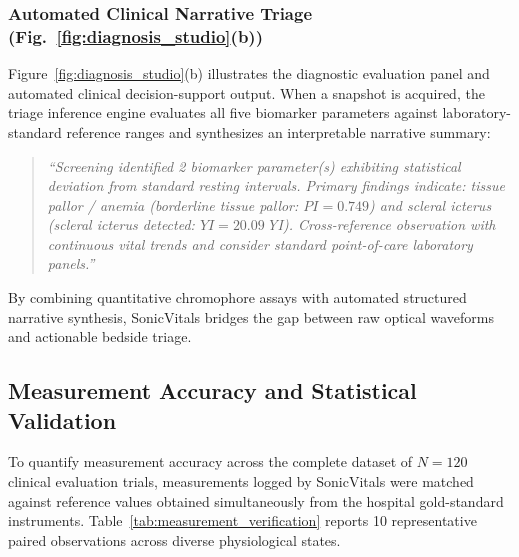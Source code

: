 \documentclass[journal]{IEEEtran}
\begin{document}
\subsubsection{Automated Clinical Narrative Triage (Fig.~\ref{fig:diagnosis_studio}(b))}
Figure~\ref{fig:diagnosis_studio}(b) illustrates the diagnostic evaluation panel and automated clinical decision-support output. When a snapshot is acquired, the triage inference engine evaluates all five biomarker parameters against laboratory-standard reference ranges and synthesizes an interpretable narrative summary:
\begin{quote}
    \textit{``Screening identified 2 biomarker parameter(s) exhibiting statistical deviation from standard resting intervals. Primary findings indicate: tissue pallor / anemia (borderline tissue pallor: $PI = 0.749$) and scleral icterus (scleral icterus detected: $YI = 20.09$\,YI). Cross-reference observation with continuous vital trends and consider standard point-of-care laboratory panels.''}
\end{quote}
By combining quantitative chromophore assays with automated structured narrative synthesis, SonicVitals bridges the gap between raw optical waveforms and actionable bedside triage.

\subsection{Measurement Accuracy and Statistical Validation}

To quantify measurement accuracy across the complete dataset of $N=120$ clinical evaluation trials, measurements logged by SonicVitals were matched against reference values obtained simultaneously from the hospital gold-standard instruments. Table~\ref{tab:measurement_verification} reports 10 representative paired observations across diverse physiological states.
\end{document}
